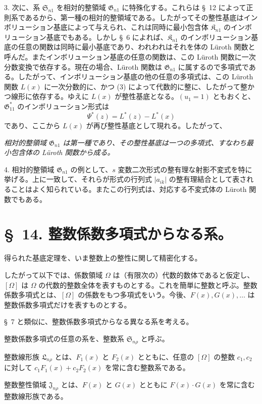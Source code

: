 \documentclass[11pt]{jlreq}
\providecommand{\Kfield}{\mathfrak{K}}
\providecommand{\Ssys}{\mathfrak{S}}
\providecommand{\Lsys}{\mathfrak{L}}
\providecommand{\Jdom}{\mathfrak{J}}
\providecommand{\Gdom}{\mathfrak{G}}
\begin{document}
3. 次に、系 $\Ssys_{n1}$ を相対的整領域 $\Gdom_{n1}$ に特殊化する。これらは \S\ 12 によって正則系であるから、第一種の相対的整領域である。したがってその整性基底はインボリューション基底によって与えられ、これは同時に最小包含体 $\Kfield_{n1}$ のインボリューション基底でもある。しかし \S\ 6 によれば、$\Kfield_{n1}$ のインボリューション基底の任意の関数は同時に最小基底であり、われわれはそれを体の Lüroth 関数と呼んだ。またインボリューション基底の任意の関数は、この Lüroth 関数に一次分数変換で依存する。現在の場合、Lüroth 関数は $\Gdom_{n1}$ に属するので多項式である。したがって、インボリューション基底の他の任意の多項式は、この Lüroth 関数 $L(x)$ に一次分数的に、かつ (3) によって代数的に整に、したがって整かつ線形に依存する。ゆえに $L(x)$ が整性基底となる。$(u_1=1)$ ともおくと、$\Gdom^*_{11}$ のインボリューション形式は
\[
  \Psi^*(z)=L^*(z)-L^*(x)
\]
であり、ここから $L(x)$ が再び整性基底として現れる。したがって、

\emph{相対的整領域 $\Gdom_{n1}$ は第一種であり、その整性基底は一つの多項式、すなわち最小包含体の Lüroth 関数から成る。}

4. 相対的整領域 $\Gdom_{n1}$ の例として、$s$ 変数二次形式の整有理な射影不変式を特に挙げる。上に一致して、それらが形式の行列式 $|a_{ik}|$ の整有理結合として表されることはよく知られている。またこの行列式は、対応する不変式体の Lüroth 関数でもある。

\section*{\S\ 14. 整数係数多項式からなる系。}

得られた基底定理を、いま整数上の整性に関して精密化する。

したがって以下では、係数領域 $\Omega$ は（有限次の）代数的数体であると仮定し、$[\Omega]$ は $\Omega$ の代数的整数全体を表すものとする。これを簡単に整数と呼ぶ。整数係数多項式とは、$[\Omega]$ の係数をもつ多項式をいう。今後、$F(x),G(x),\ldots$ は整数係数多項式だけを表すものとする。

\S\ 7 と類似に、整数係数多項式からなる異なる系を考える。

整数係数多項式の任意の系を、整数系 $\Ssys_{n\rho}$ と呼ぶ。

整数線形族 $\Lsys_{n\rho}$ とは、$F_1(x)$ と $F_2(x)$ とともに、任意の $[\Omega]$ の整数 $c_1,c_2$ に対して $c_1F_1(x)+c_2F_2(x)$ を常に含む整数系である。

整数整性領域 $\Jdom_{n\rho}$ とは、$F(x)$ と $G(x)$ とともに $F(x)\cdot G(x)$ を常に含む整数線形族である。
\end{document}
